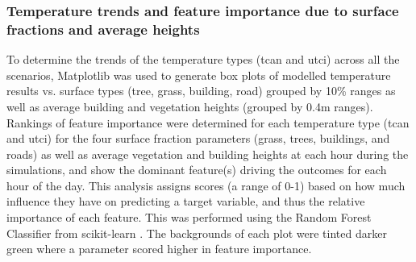 \documentclass[final,3p,times,authoryear]{elsarticle}
\begin{document}


\subsubsection{Temperature trends and feature importance due to surface fractions and average heights}\label{sec:methodstempvspercent}

%


To determine the trends of the temperature types (\gls{tcan} and \gls{utci}) across all the scenarios, Matplotlib \citep{Hunter2007} was used to generate box plots of modelled temperature results vs. surface types (tree, grass, building, road) grouped by 10\% ranges as well as average building and vegetation heights (grouped by 0.4m ranges). Rankings of feature importance were determined for each temperature type (\gls{tcan} and \gls{utci}) for the four surface fraction parameters (grass, trees, buildings, and roads) as well as average vegetation and building heights at each hour during the simulations, and show the dominant feature(s) driving the outcomes for each hour of the day. This analysis assigns scores (a range of 0-1) based on how much influence they have on predicting a target variable, and thus the relative importance of each feature. This was performed using the Random Forest Classifier from  scikit-learn \citep{scikit-learn}. The backgrounds of each plot were tinted darker green where a parameter scored higher in feature importance. 
\end{document}
